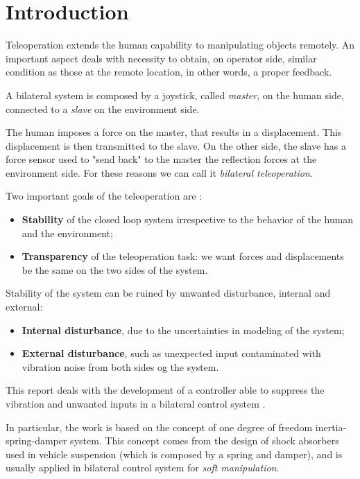 \section*{Introduction}


Teleoperation extends the human capability to manipulating objects remotely. An important aspect deals with necessity to obtain, on operator side, similar condition as those at the remote location, in other words, a proper feedback. 

A bilateral system is composed by a joystick, called \emph{master}, on the human side, connected to a \emph{slave} on the environment side.

The human imposes a force on the master, that results in a displacement. This displacement is then transmitted to the slave. On the other side, the slave has a force sensor used to "send back" to the master the reflection forces at the environment side. For these reasons we can call it \emph{bilateral teleoperation}.

Two important goals of the teleoperation are \cite{hokayem2006bilateral}:
\begin{itemize}
	\item \textbf{Stability} of the closed loop system irrespective to the behavior of the human and the environment;
	\item \textbf{Transparency} of the teleoperation task: we want forces and displacements be the same on the two sides of the system. 
\end{itemize}

Stability of the system can be ruined by unwanted disturbance, internal and external:
\begin{itemize}
	\item \textbf{Internal disturbance}, due to the uncertainties in modeling of the system;
	\item \textbf{External disturbance}, such as unexpected input contaminated with vibration noise from both sides og the system.
\end{itemize}

This report deals with the development of a controller able to suppress the vibration and unwanted inputs in a bilateral control system \cite{trakarnchaiyo2017vibration}.

In particular, the work is based on the concept of one degree of freedom inertia-spring-damper system. This concept comes from the design of shock absorbers used in vehicle suspension (which is composed by a spring and damper), and is usually applied in bilateral control system for \emph{soft manipulation}.

